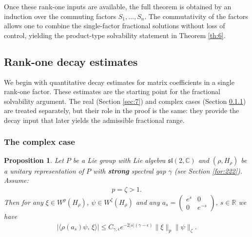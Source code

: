 \documentclass[11 pt]{amsart}
\newcommand{\RR}{\mathbb{R}}
\newcommand{\CC}{\mathbb{C}}
\newtheorem{proposition}[theorem]{Proposition}
\theoremstyle{definition}
\numberwithin{equation}{section}
\begin{document}
Once these rank-one inputs are available, the full theorem is obtained by an
induction over the commuting factors $S_1,\dots,S_n$. The commutativity of the
factors allows one to combine the single-factor fractional solutions without
loss of control, yielding the product-type solvability statement in Theorem
\ref{th:6}.
\subsection{Rank-one decay estimates} We begin with quantitative decay estimates for matrix coefficients in a
single rank-one factor. These estimates are the starting point for the
fractional solvability argument. The real (Section \ref{sec:7}) and complex cases (Section \ref{sec:5}) are treated
separately, but their role in the proof is the same: they provide the decay
input that later yields the admissible fractional range.
\subsubsection{The complex case} \label{sec:5}

\begin{proposition}\label{po:1} Let $P$ be a Lie group with Lie algebra $\mathfrak{sl}(2,\CC)$ and $(\rho,H_\rho)$ be a unitary representation of $P$ with \textbf{strong }spectral gap $\gamma$ (see Section \ref{for:222}).  Assume:
\begin{align*}
 p=\zeta>1.
\end{align*}
 Then for any $\xi\in W^{p}(H_\rho)$, $\psi\in W^{\zeta}(H_\rho)$ and
  any $a_s = \begin{pmatrix} e^{s} & 0 \\[5pt]
0 & e^{-s} \end{pmatrix}$, $s\in\RR$ we have
  \begin{align*}
\big|\langle \rho(a_s)\psi,\, \xi\rangle \big|\leq C_{\gamma,\epsilon}e^{-2|s|(\gamma-\epsilon)} \| \xi \|_{p} \big\|\psi\big\|_{\zeta}.
\end{align*}





\end{proposition}
\end{document}
